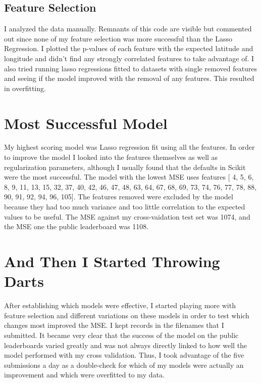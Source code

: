 \documentclass[10pt]{amsart}
\begin{document}
\subsection{Feature Selection}
I analyzed the data manually.  Remnants of this code are visible but commented out since none of my feature selection was more successful than the Lasso Regression.  I plotted the p-values of each feature with the expected latitude and longitude and didn't find any strongly correlated features to take advantage of.  I also tried running lasso regressions fitted to datasets with single removed features and seeing if the model improved with the removal of any features.  This resulted in overfitting.

\section{Most Successful Model}
My highest scoring model was Lasso regression fit using all the features.  In order to improve the model I looked into the features themselves as well as regularization parameters, although I usually found that the defaults in Scikit were the most successful.  The model with the lowest MSE uses features [  4,   5,   6,   8,   9,  11,  13,  15,  32,  37,  40,  42,  46, 47,  48,  63,  64,  67,  68,  69,  73,  74,  76,  77,  78,  88, 90,  91,  92,  94,  96, 105].  The features removed were excluded by the model because they had too much variance and too little correlation to the expected values to be useful. The MSE against my cross-vaidation test set was 1074, and the MSE one the public leaderboard was 1108.

\section{And Then I Started Throwing Darts}
After establishing which models were effective, I started playing more with feature selection and different variations on these models in order to test which changes most improved the MSE.  I kept records in the filenames that I submitted.  It became very clear that the success of the model on the public leaderboards varied greatly and was not always directly linked to how well the model performed with my cross validation.  Thus, I took advantage of the five submissions a day as a double-check for which of my models were actually an improvement and which were overfitted to my data.
\end{document}
